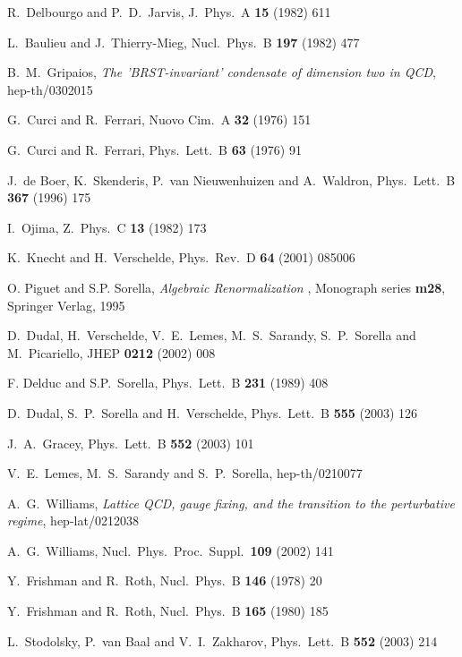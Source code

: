 \documentclass[a4paper,12pt]{article}
\begin{document}
\begin{thebibliography}{99}
  R.~Delbourgo and P.~D.~Jarvis, J.\ Phys.\ A
\textbf{15} (1982) 611

  L.~Baulieu and J.~Thierry-Mieg, Nucl.\ Phys.\ B
\textbf{197} (1982) 477

  B.~M.~Gripaios, \emph{The 'BRST-invariant' condensate of dimension two in QCD},
\mbox{hep-th/0302015}

  G.~Curci and R.~Ferrari, Nuovo Cim.\ A \textbf{32}
(1976) 151

  G.~Curci and R.~Ferrari, Phys.\ Lett.\ B \textbf{63}
(1976) 91

  J.~de Boer, K.~Skenderis, P.~van Nieuwenhuizen and
A.~Waldron, Phys.\ Lett.\ B \textbf{367} (1996) 175

  I.~Ojima, Z.\ Phys.\ C \textbf{13} (1982) 173

  K.~Knecht and H.~Verschelde, Phys.\ Rev.\ D \textbf{%
64} (2001) 085006

  O. Piguet and S.P. Sorella, \emph{Algebraic Renormalization}%
, Monograph series \textbf{m28}, Springer Verlag, 1995

  D.~Dudal, H.~Verschelde, V.~E.~Lemes, M.~S.~Sarandy, S.~P.~Sorella
and M.~Picariello, JHEP \textbf{0212} (2002) 008

  F. Delduc and S.P.\ Sorella, Phys.\ Lett.\ B \textbf{231}
(1989) 408

  D.~Dudal, S.~P.~Sorella and H.~Verschelde, Phys.\
Lett.\ B \textbf{555} (2003) 126

  J.~A.~Gracey, Phys.\ Lett.\ B \textbf{552} (2003)
101

  V.~E.~Lemes, M.~S.~Sarandy and S.~P.~Sorella,
hep-th/0210077

  A.~G.~Williams, \emph{Lattice QCD, gauge fixing, and the transition to the perturbative  regime}, hep-lat/0212038

  A.~G.~Williams, Nucl.\ Phys.\ Proc.\ Suppl.\
\textbf{109} (2002) 141

  Y.~Frishman and R.~Roth, Nucl.\ Phys.\ B \textbf{%
146} (1978) 20

  Y.~Frishman and R.~Roth, Nucl.\ Phys.\ B \textbf{165}
(1980) 185

  L.~Stodolsky, P.~van Baal and V.~I.~Zakharov,
Phys.\ Lett.\ B \textbf{552} (2003) 214


\end{thebibliography}
\end{document}
